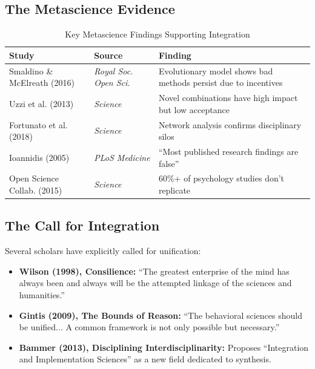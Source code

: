 \subsection{The Metascience Evidence}

\begin{table}[htbp]
\centering
\caption{Key Metascience Findings Supporting Integration}
\label{tab:metascience}
\renewcommand{\arraystretch}{1.3}
\begin{tabular}{@{}p{4cm}p{3cm}p{6cm}@{}}
\toprule
\textbf{Study} & \textbf{Source} & \textbf{Finding} \\
\midrule
Smaldino \& McElreath (2016) & \textit{Royal Soc. Open Sci.} & Evolutionary model shows bad methods persist due to incentives \\
Uzzi et al. (2013) & \textit{Science} & Novel combinations have high impact but low acceptance \\
Fortunato et al. (2018) & \textit{Science} & Network analysis confirms disciplinary silos \\
Ioannidis (2005) & \textit{PLoS Medicine} & ``Most published research findings are false'' \\
Open Science Collab. (2015) & \textit{Science} & 60\%+ of psychology studies don't replicate \\
\bottomrule
\end{tabular}
\end{table}

\subsection{The Call for Integration}

Several scholars have explicitly called for unification:

\begin{itemize}
\item \textbf{Wilson (1998), Consilience:} ``The greatest enterprise of the mind has always been and always will be the attempted linkage of the sciences and humanities.''

\item \textbf{Gintis (2009), The Bounds of Reason:} ``The behavioral sciences should be unified... A common framework is not only possible but necessary.''

\item \textbf{Bammer (2013), Disciplining Interdisciplinarity:} Proposes ``Integration and Implementation Sciences'' as a new field dedicated to synthesis.
\end{itemize}

